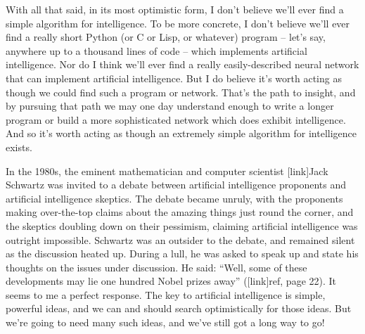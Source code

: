 \documentclass[a4paper,twoside,10pt]{book}
\begin{document}
With all that said, in its most optimistic form, I don't believe we'll ever find a simple algorithm for intelligence. To be more concrete, I don't believe we'll ever find a really short Python (or C or Lisp, or whatever) program -- let's say, anywhere up to a thousand lines of code -- which implements artificial intelligence. Nor do I think we'll ever find a really easily-described neural network that can implement artificial intelligence. But I do believe it's worth acting as though we could find such a program or network. That's the path to insight, and by pursuing that path we may one day understand enough to write a longer program or build a more sophisticated network which does exhibit intelligence. And so it's worth acting as though an extremely simple algorithm for intelligence exists.

In the 1980s, the eminent mathematician and computer scientist [link]Jack Schwartz was invited to a debate between artificial intelligence proponents and artificial intelligence skeptics. The debate became unruly, with the proponents making over-the-top claims about the amazing things just round the corner, and the skeptics doubling down on their pessimism, claiming artificial intelligence was outright impossible. Schwartz was an outsider to the debate, and remained silent as the discussion heated up. During a lull, he was asked to speak up and state his thoughts on the issues under discussion. He said: ``Well, some of these developments may lie one hundred Nobel prizes away'' ([link]ref, page 22). It seems to me a perfect response. The key to artificial intelligence is simple, powerful ideas, and we can and should search optimistically for those ideas. But we're going to need many such ideas, and we've still got a long way to go!
\end{document}
